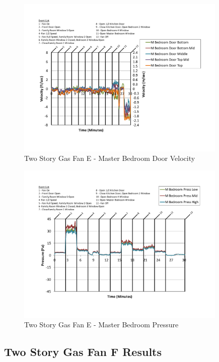 \documentclass{article}
\begin{document}
\begin{appendices}
	\begin{figure}[H]
		\centering
		\includegraphics[height=3.05in,trim=0.67in 1.1in 0.67in 0.8in,clip=true]{0_Images/Results_Charts/ColdFlow/Two_Story/Gas/E/Master_Bedroom_Door_Velocity.pdf}
		\caption{Two Story Gas Fan E - Master Bedroom Door Velocity}
	\end{figure}
 

	\begin{figure}[H]
		\centering
		\includegraphics[height=3.05in,trim=0.67in 1.1in 0.67in 0.8in,clip=true]{0_Images/Results_Charts/ColdFlow/Two_Story/Gas/E/Master_Bedroom_Pressure.pdf}
		\caption{Two Story Gas Fan E - Master Bedroom Pressure}
	\end{figure}
 
	\clearpage

		\clearpage
\clearpage		\large
\subsection{Two Story Gas Fan F Results} \label{App:Two_StoryGasFanFResults} 


\end{appendices}
\end{document}
